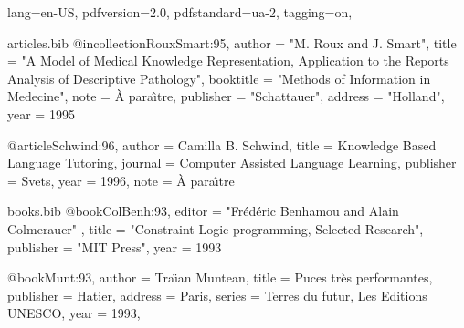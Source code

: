 \ifdefined\Uchar\RequirePackage{luatagging}\fi
\DocumentMetadata
  {
    lang=en-US,
    pdfversion=2.0,
    pdfstandard=ua-2,
    tagging=on,
  }
\begin{filecontents}[overwrite]{articles.bib}
@incollection{RouxSmart:95,
    author    = "M. Roux and J. Smart",
    title     = "A Model of Medical Knowledge Representation, Application
                 to the Reports Analysis of Descriptive Pathology",
    booktitle = "Methods of Information in Medecine",
    note      = {\`A para\^{\i}tre},
    publisher = "Schattauer",
    address   = "Holland",
    year      = 1995
}

@article{Schwind:96,
    author    = {Camilla B. Schwind},
    title     = {Knowledge Based Language Tutoring},
    journal   = {Computer Assisted Language Learning},
    publisher = {Svets},
    year      = 1996,
    note      = {\`A para\^{\i}tre}
}
\end{filecontents}
\begin{filecontents}[overwrite]{books.bib}
@book{ColBenh:93,
   editor = "Fr\'ed\'eric Benhamou and Alain Colmerauer" ,
   title = "Constraint Logic programming, Selected Research",
   publisher = "MIT Press",
   year = 1993
}

@book{Munt:93,
   author =    {Tra{\"\i}an Muntean},
   title =     {Puces tr\`es performantes},
   publisher = {Hatier},
   address =   {Paris},
   series = {Terres du futur, Les Editions UNESCO},
   year =      1993,
}
\end{filecontents}

\documentclass[10pt]{article}
\usepackage{bibtopic}
\usepackage{hyperref}

